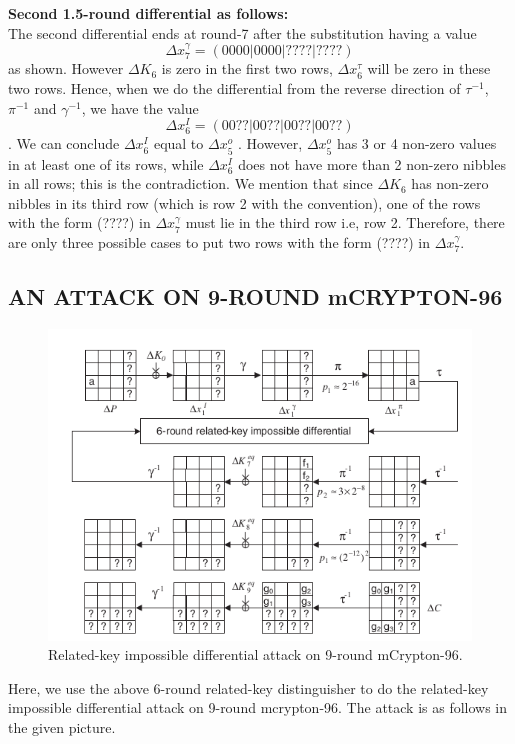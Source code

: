 \documentclass{transcrypto}
\begin{document}
	\textbf {Second 1.5-round differential as follows:}\\
	The second differential ends at round-7 after the substitution having a value $$\Delta x_7^{\gamma} = (0000|0000|????|????)$$ as shown. However $\Delta K_6$ is zero in the first two rows, $\Delta x_6^{\tau}$ will be zero in these two rows. Hence, when we do the differential from the reverse direction of $\tau^{-1}$, $\pi^{-1}$ and $\gamma^{-1}$, we have the value $$\Delta x_6^{I} = (00??|00??|00??|00??)$$. We can conclude $\Delta x_6^{I}$ equal to  $\Delta x_5^{o}$ . However, $\Delta x_5^{o}$ has 3 or 4 non-zero values in at least one of its rows, while $\Delta x_6^{I}$ does not have more than 2 non-zero nibbles in all rows; this is the contradiction. We mention that since $\Delta K_6$ has non-zero nibbles in its third row (which is row 2 with the convention), one of the rows with the form (????) in $\Delta x_7^{\gamma}$ must lie in the third row i.e, row 2. Therefore, there are only three possible cases to put two rows with the form (????) in $\Delta x_7^{\gamma}$.
	\subsection{AN ATTACK ON 9-ROUND mCRYPTON-96}
	\begin{figure}[H]
		\includegraphics[width=1\linewidth]{2.png}
		\caption{Related-key impossible differential attack on 9-round mCrypton-96.}
	\end{figure}
	Here, we use the above 6-round related-key distinguisher to do the related-key impossible differential attack on 9-round mcrypton-96. The attack is as follows in the given picture.
	
\end{document}
